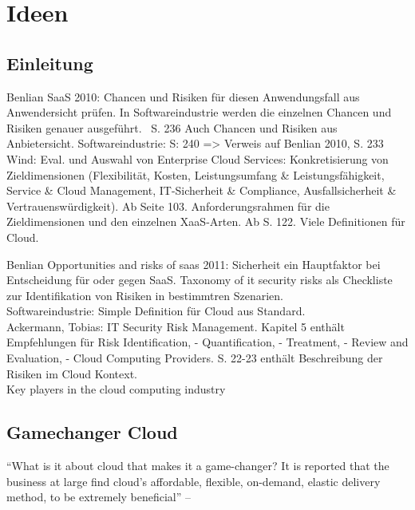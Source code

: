 \section{Ideen}
\subsection{Einleitung}
Benlian SaaS 2010: Chancen und Risiken für diesen Anwendungsfall aus Anwendersicht prüfen. In Softwareindustrie werden die einzelnen Chancen und Risiken genauer ausgeführt. ~S. 236
Auch Chancen und Risiken aus Anbietersicht. Softwareindustrie: S: 240 => Verweis auf Benlian 2010, S. 233 \\
Wind: Eval. und Auswahl von Enterprise Cloud Services: Konkretisierung von Zieldimensionen (Flexibilität, Kosten, Leistungsumfang  \& Leistungsfähigkeit, Service \& Cloud Management, IT-Sicherheit \&
Compliance, Ausfallsicherheit \& Vertrauenswürdigkeit). Ab Seite 103. Anforderungsrahmen für die Zieldimensionen und den einzelnen XaaS-Arten. Ab S. 122. Viele Definitionen für Cloud.

Benlian Opportunities and risks of saas 2011: Sicherheit ein Hauptfaktor bei Entscheidung für oder gegen SaaS. Taxonomy of it security risks als Checkliste zur Identifikation von Risiken in bestimmtren
Szenarien. \\

Softwareindustrie: Simple Definition für Cloud aus Standard. \\

Ackermann, Tobias: IT Security Risk Management. Kapitel 5 enthält Empfehlungen für Risk Identification, - Quantification, - Treatment, - Review and Evaluation, - Cloud Computing Providers. S. 22-23 enthält
Beschreibung der Risiken im Cloud Kontext. \\

Key players in the cloud computing industry 
\\



\subsection{Gamechanger Cloud}
"`What is it about cloud that makes it a game-changer? It
is reported that the business at large find cloud’s affordable,
flexible, on-demand, elastic delivery method, to be extremely
beneficial"'
-- 


